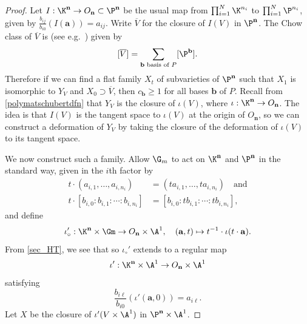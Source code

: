 \begin{lemm}\label{chowclass:positivity}
\end{lemm}
\begin{proof}
  Let $I: \K^{\mathbf n} \to O_{\mathbf n} \subset \P^{\mathbf{n}}$ be the usual map from $\prod_{i=1}^N \K^{n_i}$ to $\prod_{i=1}^N\P^{n_i}$, given by $\frac{b_{ij}}{b_{i0}}(I(\mathbf a)) = a_{ij}$.
  Write $\overline V$ for the closure of $I(V)$ in $\P^{\mathbf n}$. The Chow class of $\overline V$ is (see e.g.~\cite{CFCYL20}) given by
  \[
    [\overline V] = \sum_{\text{$\mathbf b$ basis of $P$}} [\P^{\mathbf b}].
  \]
  Therefore if we can find a flat family $X_t$ of subvarieties of $\P^{\mathbf{n}}$ such that $X_1$ is isomorphic to $Y_V$ and $X_0 \supset \overline V$, then $c_{\mathbf b} \geq 1$ for all bases $\mathbf b$ of $P$.   Recall from \cref{polymatschubertdfn} that $Y_V$ is the closure of $\iota(V)$, where $\iota: \K^{\mathbf n} \to O_{\mathbf n}$. The idea is that $I(V)$ is the tangent space to $\iota(V)$ at the origin of $O_{\mathbf{n}}$, so we can construct a deformation of $Y_V$ by taking the closure of the deformation of $\iota(V)$ to its tangent space. 
  

  We now construct such a family. Allow $\G_m$ to act on $\K^{\mathbf n}$ and $\P^{\mathbf n}$ in the standard way, given in the $i$th factor by
  \begin{align*}
    t \cdot (a_{i,1},\ldots, a_{i,n_i}) &= (t a_{i,1}, \ldots, t a_{i,n_i}) \quad \text{and} \\
    t \cdot [b_{i,0}: b_{i,1}: \cdots : b_{i,n_i}] &= [b_{i,0}: t b_{i,1} : \cdots : t b_{i,n_i}],
  \end{align*}
  and define
  \[
    \iota_\circ': \K^{\mathbf n} \times \Gm \to O_{\mathbf n} \times \A^1, \quad (\mathbf a, t) \mapsto t^{-1} \cdot \iota(t \cdot \mathbf a).
  \]
  From \cref{sec_HT}, we see that
\revision{  \[
    \frac{b_{i\ell}}{b_{i0}}(\iota'_\circ(\mathbf a, t)) = \sum_{j_1+2j_2 + \cdots + \ell j_\ell = \ell} t^{j_1+j_2+\cdots+j_\ell - 1} \frac{a_{i,1}^{j_1} a_{i,2}^{j_2} \cdots a_{i,\ell}^{j_\ell}}{j_1! j_2! \cdots j_\ell!}, \quad 1 \leq \ell \leq n_i,
  \]}
  so $\iota_\circ'$ extends to a regular map
  \[
    \iota': \K^{\mathbf n} \times \A^1 \to O_{\mathbf n} \times \A^1
  \]
  satisfying
  \[
    \frac{b_{i\ell}}{b_{i0}}(\iota'(\mathbf a, 0)) = a_{i\ell}.
  \]
  Let $X$ be the closure of $\iota'(V \times \A^1)$ in $\P^{\mathbf n} \times \A^1$. 


\end{proof}
